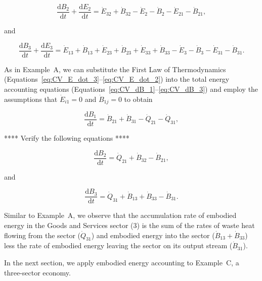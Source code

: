 \begin{equation} \label{eq:CV_dB_2}
	\frac{\mathrm{d}B_{2}}{\mathrm{d}t} 
	+ \frac{\mathrm{d}E_{2}}{\mathrm{d}t} 
	= \dot{E}_{32} 
	+ \dot{B}_{32} 
	- \dot{E}_2
	- \dot{B}_2
	- \dot{E}_{21} 
	- \dot{B}_{21},
\end{equation}

\noindent and 

\begin{equation} \label{eq:CV_dB_3}
	\frac{\mathrm{d}B_{3}}{\mathrm{d}t} 
	+ \frac{\mathrm{d}E_{3}}{\mathrm{d}t} 
	= \dot{E}_{13} 
	+ \dot{B}_{13} 
	+ \dot{E}_{23}
	+ \dot{B}_{23}
	+ \dot{E}_{33} 
	+ \dot{B}_{33} 
	- \dot{E}_{3} 
	- \dot{B}_{3} 
	- \dot{E}_{31} 
	- \dot{B}_{31}.
\end{equation}

As in Example~A, we can substitute the First Law of Thermodynamics 
(Equations~\ref{eq:CV_E_dot_3}--\ref{eq:CV_E_dot_2})
into the total energy accounting equations
(Equations~\ref{eq:CV_dB_1}--\ref{eq:CV_dB_3}) 
and employ the assumptions that 
$\dot{E}_{i1} = 0$ and
$\dot{B}_{1j} = 0$ 
to obtain

\begin{equation} \label{eq:B_embodied_energy_accounting_1}
	\frac{\mathrm{d}B_{1}}{\mathrm{d}t} 
	= \dot{B}_{21} 
	+ \dot{B}_{31} 
	- \dot{Q}_{21} 
	- \dot{Q}_{31}, 
\end{equation}

**** Verify the following equations ****

\begin{equation} \label{eq:B_embodied_energy_accounting_2}
	\frac{\mathrm{d}B_{2}}{\mathrm{d}t} 
	= \dot{Q}_{21} 
	+ \dot{B}_{32} 
	- \dot{B}_{21},
\end{equation}

\noindent and

\begin{equation} \label{eq:B_embodied_energy_accounting_3}
	\frac{\mathrm{d}B_3}{\mathrm{d}t} 
	= \dot{Q}_{31} 
	+ \dot{B}_{13} 
	+ \dot{B}_{33} 
	- \dot{B}_{31}.
\end{equation}

Similar to Example~A, we observe that the accumulation rate 
of embodied energy in the Goods and Services sector (3) 
is the sum of the rates of waste heat flowing from the sector 
($\dot{Q}_{31}$) and embodied energy into the sector 
($\dot{B}_{13} + \dot{B}_{33}$) 
less the rate of embodied energy leaving the sector 
on its output stream ($\dot{B}_{31}$).

In the next section, we apply embodied energy accounting to 
Example~C, a three-sector economy.


